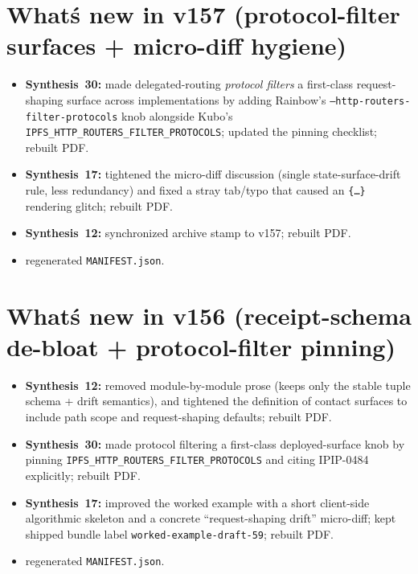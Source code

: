 \documentclass[11pt]{article}
\begin{document}
\section{What\'s new in v157 (protocol-filter surfaces + micro-diff hygiene)}
\begin{itemize}[leftmargin=*]
\item \textbf{Synthesis~30:} made delegated-routing \emph{protocol filters} a first-class request-shaping surface across implementations by adding Rainbow's \texttt{--http-routers-filter-protocols} knob alongside Kubo's \texttt{IPFS\_HTTP\_ROUTERS\_FILTER\_PROTOCOLS}; updated the pinning checklist; rebuilt PDF.
\item \textbf{Synthesis~17:} tightened the micro-diff discussion (single state-surface-drift rule, less redundancy) and fixed a stray tab/typo that caused an \texttt{\texttt\{\dots\}} rendering glitch; rebuilt PDF.
\item \textbf{Synthesis~12:} synchronized archive stamp to v157; rebuilt PDF.
\item regenerated \texttt{MANIFEST.json}.
\end{itemize}

\section{What\'s new in v156 (receipt-schema de-bloat + protocol-filter pinning)}
\begin{itemize}[leftmargin=*]
\item \textbf{Synthesis~12:} removed module-by-module prose (keeps only the stable tuple schema + drift semantics), and tightened the definition of contact surfaces to include path scope and request-shaping defaults; rebuilt PDF.
\item \textbf{Synthesis~30:} made protocol filtering a first-class deployed-surface knob by pinning \texttt{IPFS\_HTTP\_ROUTERS\_FILTER\_PROTOCOLS} and citing IPIP-0484 explicitly; rebuilt PDF.
\item \textbf{Synthesis~17:} improved the worked example with a short client-side algorithmic skeleton and a concrete ``request-shaping drift'' micro-diff; kept shipped bundle label \texttt{worked-example-draft-59}; rebuilt PDF.
\item regenerated \texttt{MANIFEST.json}.
\end{itemize}
\end{document}
